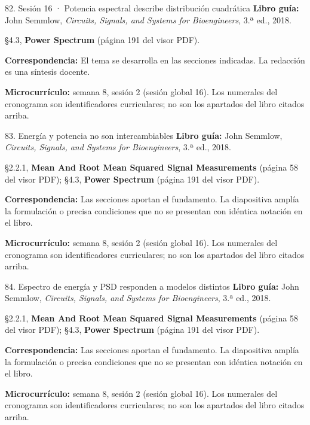 \documentclass[
  10pt,
  ignorenonframetext,
  aspectratio=169,
  spanish,
]{beamer}
\begin{document}
\begin{frame}{82. Sesión 16 · Potencia espectral describe distribución
cuadrática}
\label{sesiuxf3n-16-potencia-espectral-describe-distribuciuxf3n-cuadruxe1tica}
\textbf{Libro guía:} John Semmlow, \emph{Circuits, Signals, and Systems
for Bioengineers}, 3.ª ed., 2018.

§4.3, \textbf{Power Spectrum} (página 191 del visor PDF).

\textbf{Correspondencia:} El tema se desarrolla en las secciones
indicadas. La redacción es una síntesis docente.

\textbf{Microcurrículo:} semana 8, sesión 2 (sesión global 16). Los
numerales del cronograma son identificadores curriculares; no son los
apartados del libro citados arriba.
\end{frame}

\begin{frame}{83. Energía y potencia no son intercambiables}
\label{energuxeda-y-potencia-no-son-intercambiables}
\textbf{Libro guía:} John Semmlow, \emph{Circuits, Signals, and Systems
for Bioengineers}, 3.ª ed., 2018.

§2.2.1, \textbf{Mean And Root Mean Squared Signal Measurements} (página
58 del visor PDF); §4.3, \textbf{Power Spectrum} (página 191 del visor
PDF).

\textbf{Correspondencia:} Las secciones aportan el fundamento. La
diapositiva amplía la formulación o precisa condiciones que no se
presentan con idéntica notación en el libro.

\textbf{Microcurrículo:} semana 8, sesión 2 (sesión global 16). Los
numerales del cronograma son identificadores curriculares; no son los
apartados del libro citados arriba.
\end{frame}

\begin{frame}{84. Espectro de energía y PSD responden a modelos
distintos}
\label{espectro-de-energuxeda-y-psd-responden-a-modelos-distintos}
\textbf{Libro guía:} John Semmlow, \emph{Circuits, Signals, and Systems
for Bioengineers}, 3.ª ed., 2018.

§2.2.1, \textbf{Mean And Root Mean Squared Signal Measurements} (página
58 del visor PDF); §4.3, \textbf{Power Spectrum} (página 191 del visor
PDF).

\textbf{Correspondencia:} Las secciones aportan el fundamento. La
diapositiva amplía la formulación o precisa condiciones que no se
presentan con idéntica notación en el libro.

\textbf{Microcurrículo:} semana 8, sesión 2 (sesión global 16). Los
numerales del cronograma son identificadores curriculares; no son los
apartados del libro citados arriba.
\end{frame}
\end{document}
